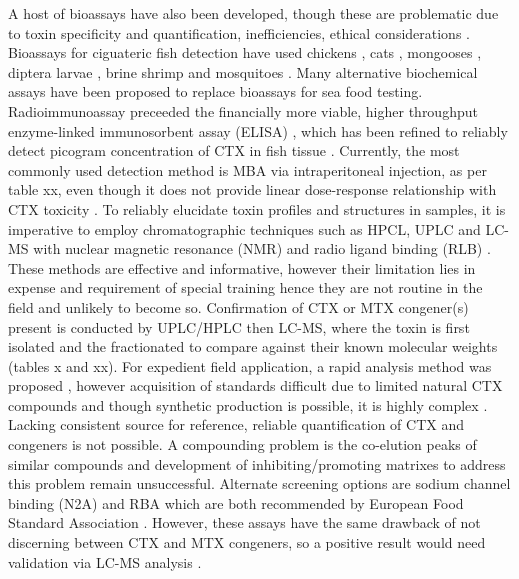 \documentclass[12pt]{article}
\begin{document}
A host of bioassays have also been developed, though these are problematic due to toxin specificity and quantification, inefficiencies, ethical considerations \cite{dickey2010ciguatera}.
Bioassays for ciguateric fish detection have used chickens \cite{}, cats \cite{larson1967ciguatera}, mongooses \cite{hokama1977radioimmunoassay}, diptera larvae \cite{labrousse1996toxicological}, brine shrimp \cite{granade1976ciguatera} and mosquitoes \cite{bagnis1987use}.
Many alternative biochemical assays have been proposed to replace bioassays for sea food testing. Radioimmunoassay \cite{hokama1977radioimmunoassay} preceeded the financially more viable, higher throughput enzyme-linked immunosorbent assay (ELISA) \cite{hokama1983rapid}, which has been refined to reliably detect picogram concentration of CTX in fish tissue \cite{campora2008detection,campora2010evaluating}. Currently, the most commonly used detection method is MBA via intraperitoneal injection, as per table xx, even though it does not provide linear dose-response relationship with CTX toxicity \cite{hoffman1983mouse}. 
To reliably elucidate toxin profiles and structures in samples, it is imperative to employ chromatographic techniques such as HPCL, UPLC and LC-MS with nuclear magnetic resonance (NMR) \cite{legrand1989isolation,murata1990structures,murata1990structures,satake1996isolation,diogened2014chemistry} and radio ligand binding (RLB) \cite{hamilton2002multiple,hamilton2002isolation}. These methods are effective and informative, however their limitation lies in expense and requirement of special training hence they are not routine in the field and unlikely to become so. %
Confirmation of CTX or MTX congener(s) present is conducted by UPLC/HPLC then LC-MS, where the toxin is first isolated and the fractionated to compare against their known molecular weights (tables x and xx). For expedient field application, a rapid analysis method was proposed \cite{lewis2009rapid}, however acquisition of standards difficult due to limited natural CTX compounds \cite{berdalet2012global} and though synthetic production is possible, it is highly complex \cite{hirama2001total}. Lacking consistent source for reference, reliable quantification of CTX and congeners is not possible. A compounding problem is the co-elution peaks of similar compounds and development of inhibiting/promoting matrixes to address this problem remain unsuccessful.
Alternate screening options are sodium channel binding (N2A) \cite{dickey2010ciguatera} and RBA \cite{poli1997identification,darius2007ciguatera} which are both recommended by European Food Standard Association \cite{}. %
However, these assays have the same drawback of not discerning between CTX and MTX congeners, so a positive result would need validation via LC-MS analysis \cite{diogened2014chemistry}. 
\end{document}
